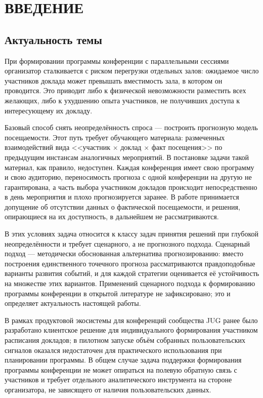 \chapter*{ВВЕДЕНИЕ}
\sloppy


\section*{Актуальность темы}

При формировании программы конференции с параллельными сессиями организатор сталкивается с риском перегрузки отдельных залов: ожидаемое число участников доклада может превышать вместимость зала, в котором он проводится. Это приводит либо к физической невозможности разместить всех желающих, либо к ухудшению опыта участников, не получивших доступа к интересующему их докладу.

Базовый способ снять неопределённость спроса — построить прогнозную модель посещаемости. Этот путь требует обучающего материала: размеченных взаимодействий вида <<участник $\times$ доклад $\times$ факт посещения>> по предыдущим инстансам аналогичных мероприятий. В постановке задачи такой материал, как правило, недоступен. Каждая конференция имеет свою программу и свою аудиторию, переносимость прогноза с одной конференции на другую не гарантирована, а часть выбора участником докладов происходит непосредственно в день мероприятия и плохо прогнозируется заранее. В работе принимается допущение об отсутствии данных о фактической посещаемости, и решения, опирающиеся на их доступность, в дальнейшем не рассматриваются.

В этих условиях задача относится к классу задач принятия решений при глубокой неопределённости и требует сценарного, а не прогнозного подхода. Сценарный подход — методически обоснованная альтернатива прогнозированию: вместо построения единственного точечного прогноза рассматриваются правдоподобные варианты развития событий, и для каждой стратегии оценивается её устойчивость на множестве этих вариантов. Применений сценарного подхода к формированию программы конференции в открытой литературе не зафиксировано; это и определяет актуальность настоящей работы.

В рамках продуктовой экосистемы для конференций сообщества JUG ранее было разработано клиентское решение для индивидуального формирования участником расписания докладов; в пилотном запуске объём собранных пользовательских сигналов оказался недостаточен для практического использования при планировании программы. В общем случае задача поддержки формирования программы конференции не может опираться на полевую обратную связь с участников и требует отдельного аналитического инструмента на стороне организатора, не зависящего от наличия пользовательских данных.


